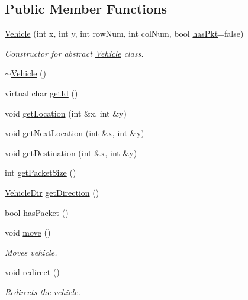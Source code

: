 \subsection*{Public Member Functions}
\begin{DoxyCompactItemize}
\item 
\hyperlink{class_vehicle_a60120dee00c4b6fec2666828ae0015a5}{Vehicle} (int x, int y, int row\+Num, int col\+Num, bool \hyperlink{class_vehicle_a1d5bd3f458b1c11f0034320e8be4ae32}{has\+Pkt}=false)
\begin{DoxyCompactList}\small\item\em Constructor for abstract \hyperlink{class_vehicle}{Vehicle} class. \end{DoxyCompactList}\item 
\hyperlink{class_vehicle_a61ab140c755b8e0e824d54117cf4546f}{$\sim$\+Vehicle} ()
\item 
virtual char \hyperlink{class_vehicle_a2233c46c45ad1efd5a1e190716592f16}{get\+Id} ()
\item 
void \hyperlink{class_vehicle_a3dc4583c9a0bc76d0b82092d89e8bab8}{get\+Location} (int \&x, int \&y)
\item 
void \hyperlink{class_vehicle_abb74d1686a72682017d08a857cc2dae2}{get\+Next\+Location} (int \&x, int \&y)
\item 
void \hyperlink{class_vehicle_a120147fedf77a556438bf2473cea6f5d}{get\+Destination} (int \&x, int \&y)
\item 
int \hyperlink{class_vehicle_a24d645b977cd08d10b759d34fedbc339}{get\+Packet\+Size} ()
\item 
\hyperlink{vehicle_8h_ab81942edaa6e6c3f12551c3d0e511b85}{Vehicle\+Dir} \hyperlink{class_vehicle_ace83a5a3294d0486c7afc21485f83997}{get\+Direction} ()
\item 
bool \hyperlink{class_vehicle_acfbaaeb20003015ae6af55426f5e6f46}{has\+Packet} ()
\item 
void \hyperlink{class_vehicle_a257dd3b4dd777389bffea92476c2971a}{move} ()
\begin{DoxyCompactList}\small\item\em Moves vehicle. \end{DoxyCompactList}\item 
void \hyperlink{class_vehicle_a19fc8fc5b5e9c2f69beea018e7113bfd}{redirect} ()
\begin{DoxyCompactList}\small\item\em Redirects the vehicle. \end{DoxyCompactList}\item 

\end{DoxyCompactItemize}
